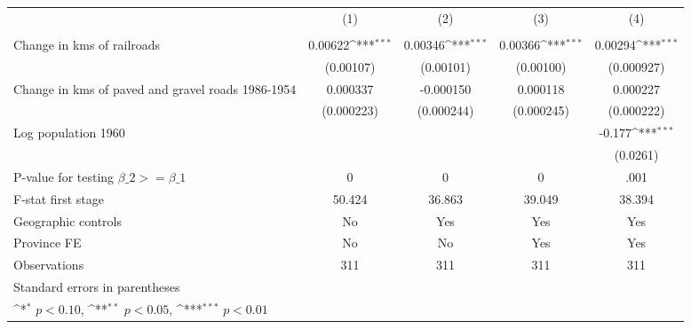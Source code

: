 {
\def\sym#1{\ifmmode^{#1}\else\(^{#1}\)\fi}
\begin{tabular}{l*{4}{c}}
\hline\hline
                &\multicolumn{1}{c}{(1)}&\multicolumn{1}{c}{(2)}&\multicolumn{1}{c}{(3)}&\multicolumn{1}{c}{(4)}\\
                &\multicolumn{1}{c}{}&\multicolumn{1}{c}{}&\multicolumn{1}{c}{}&\multicolumn{1}{c}{}\\
\hline
Change in kms of railroads&  0.00622\sym{***}&  0.00346\sym{***}&  0.00366\sym{***}&  0.00294\sym{***}\\
                &(0.00107)         &(0.00101)         &(0.00100)         &(0.000927)         \\
[1em]
Change in kms of paved and gravel roads 1986-1954& 0.000337         &-0.000150         & 0.000118         & 0.000227         \\
                &(0.000223)         &(0.000244)         &(0.000245)         &(0.000222)         \\
[1em]
Log population 1960&                  &                  &                  &   -0.177\sym{***}\\
                &                  &                  &                  & (0.0261)         \\
\hline
P-value for testing $\beta\_{2} >= \beta\_{1}$&        0         &        0         &        0         &     .001         \\
F-stat first stage&   50.424         &   36.863         &   39.049         &   38.394         \\
Geographic controls&       No         &      Yes         &      Yes         &      Yes         \\
Province FE     &       No         &       No         &      Yes         &      Yes         \\
Observations    &      311         &      311         &      311         &      311         \\
\hline\hline
\multicolumn{5}{l}{\footnotesize Standard errors in parentheses}\\
\multicolumn{5}{l}{\footnotesize \sym{*} \(p<0.10\), \sym{**} \(p<0.05\), \sym{***} \(p<0.01\)}\\
\end{tabular}
}
